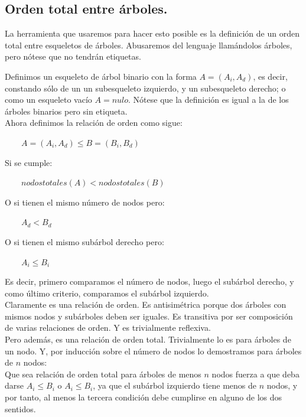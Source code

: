 \documentclass{article}
\begin{document}
\subsection {Orden total entre árboles.}

La herramienta que usaremos para hacer esto posible es la definición de un orden total entre esqueletos de árboles.
Abusaremos del lenguaje llamándolos árboles, pero nótese que no tendrán etiquetas.

Definimos un esqueleto de árbol binario con la forma $A = (A_i,A_d)$, es decir, constando sólo de un
un subesqueleto izquierdo, y un subesqueleto derecho; o como un esqueleto vacío $A = nulo$. Nótese que la definición
es igual a la de los árboles binarios pero sin etiqueta.\\

Ahora definimos la relación de orden como sigue:
\begin{adjustwidth}{2cm}{}
 $\qquad A = (A_i,A_d) \leq B = (B_i,B_d)$ 
\end{adjustwidth}
 Si se cumple: 
 \begin{adjustwidth}{2cm}{}
 $\qquad nodos totales(A) <  nodos totales(B)$ 
 \end{adjustwidth}
 O si tienen el mismo número de nodos pero: 
 \begin{adjustwidth}{2cm}{}
 $\qquad A_d < B_d$ 
 \end{adjustwidth}
 O si tienen el mismo subárbol derecho pero: 
 \begin{adjustwidth}{2cm}{}
 $\qquad A_i \leq B_i$ 
\end{adjustwidth}
Es decir, primero comparamos el número de nodos, luego el subárbol derecho, y como último criterio, comparamos el subárbol izquierdo.\\

Claramente es una relación de orden. Es antisimétrica porque dos árboles con mismos nodos y subárboles deben ser iguales.
Es transitiva por ser composición de varias relaciones de orden. Y es trivialmente reflexiva. \\

Pero además, es una relación de orden total. Trivialmente lo es para árboles de un nodo. Y, por inducción sobre el número de nodos lo demostramos para árboles de $n$ nodos: \\
\indent Que sea relación de orden total para árboles de menos $n$ nodos fuerza a que deba darse $A_i \leq B_i$ o $A_i \leq B_i$, ya que el subárbol izquierdo 
tiene menos de $n$ nodos, y por tanto, al menos la tercera condición debe cumplirse en alguno de los dos sentidos.
\end{document}
